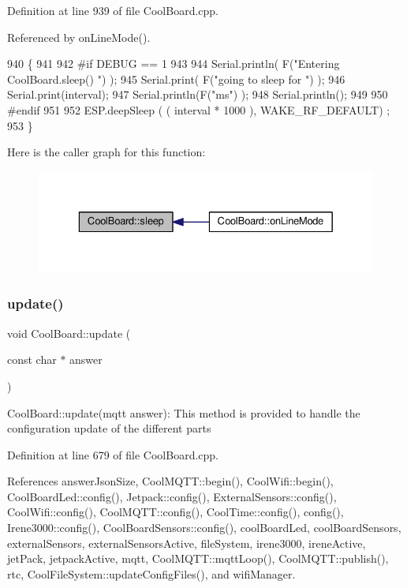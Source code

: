 Definition at line 939 of file Cool\+Board.\+cpp.



Referenced by on\+Line\+Mode().


\begin{DoxyCode}
940 \{
941 
942 \textcolor{preprocessor}{#if DEBUG == 1}
943 
944     Serial.println( F(\textcolor{stringliteral}{"Entering CoolBoard.sleep() "}) );
945     Serial.print( F(\textcolor{stringliteral}{"going to sleep for "}) );
946     Serial.print(interval);
947     Serial.println(F(\textcolor{stringliteral}{"ms"}) );
948     Serial.println();
949 
950 \textcolor{preprocessor}{#endif}
951 
952     ESP.deepSleep ( ( interval * 1000 ), WAKE\_RF\_DEFAULT) ;
953 \}
\end{DoxyCode}
Here is the caller graph for this function\+:\nopagebreak
\begin{figure}[H]
\begin{center}
\leavevmode
\includegraphics[width=329pt]{classCoolBoard_a5d0c8ff93b615efd676be432de9f164a_icgraph}
\end{center}
\end{figure}
\mbox{\label{classCoolBoard_a8612756d3f73198cdde857a66f0fe690}} 
\subsubsection{\texorpdfstring{update()}{update()}}
{\footnotesize\ttfamily void Cool\+Board\+::update (\begin{DoxyParamCaption}\item[{const char $\ast$}]{answer }\end{DoxyParamCaption})}

Cool\+Board\+::update(mqtt answer)\+: This method is provided to handle the configuration update of the different parts 

Definition at line 679 of file Cool\+Board.\+cpp.



References answer\+Json\+Size, Cool\+M\+Q\+T\+T\+::begin(), Cool\+Wifi\+::begin(), Cool\+Board\+Led\+::config(), Jetpack\+::config(), External\+Sensors\+::config(), Cool\+Wifi\+::config(), Cool\+M\+Q\+T\+T\+::config(), Cool\+Time\+::config(), config(), Irene3000\+::config(), Cool\+Board\+Sensors\+::config(), cool\+Board\+Led, cool\+Board\+Sensors, external\+Sensors, external\+Sensors\+Active, file\+System, irene3000, irene\+Active, jet\+Pack, jetpack\+Active, mqtt, Cool\+M\+Q\+T\+T\+::mqtt\+Loop(), Cool\+M\+Q\+T\+T\+::publish(), rtc, Cool\+File\+System\+::update\+Config\+Files(), and wifi\+Manager.




